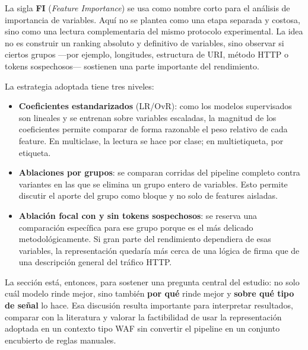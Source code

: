 \documentclass[12pt,oneside]{report}
\begin{document}
La sigla \textbf{FI} (\textit{Feature Importance}) se usa como nombre corto para el análisis de importancia de variables. Aquí no se plantea como una etapa separada y costosa, sino como una lectura complementaria del mismo protocolo experimental. La idea no es construir un ranking absoluto y definitivo de variables, sino observar si ciertos grupos ---por ejemplo, longitudes, estructura de URI, método HTTP o tokens sospechosos--- sostienen una parte importante del rendimiento.

La estrategia adoptada tiene tres niveles:
\begin{itemize}[leftmargin=*]
  \item \textbf{Coeficientes estandarizados} (LR/OvR): como los modelos supervisados son lineales y se entrenan sobre variables escaladas, la magnitud de los coeficientes permite comparar de forma razonable el peso relativo de cada feature. En multiclase, la lectura se hace por clase; en multietiqueta, por etiqueta.
  \item \textbf{Ablaciones por grupos}: se comparan corridas del pipeline completo contra variantes en las que se elimina un grupo entero de variables. Esto permite discutir el aporte del grupo como bloque y no solo de features aisladas.
  \item \textbf{Ablación focal con y sin tokens sospechosos}: se reserva una comparación específica para ese grupo porque es el más delicado metodológicamente. Si gran parte del rendimiento dependiera de esas variables, la representación quedaría más cerca de una lógica de firma que de una descripción general del tráfico HTTP.
\end{itemize}

La sección está, entonces, para sostener una pregunta central del estudio: no solo cuál modelo rinde mejor, sino también \textbf{por qué} rinde mejor y \textbf{sobre qué tipo de señal} lo hace. Esa discusión resulta importante para interpretar resultados, comparar con la literatura y valorar la factibilidad de usar la representación adoptada en un contexto tipo WAF sin convertir el pipeline en un conjunto encubierto de reglas manuales.
\end{document}
